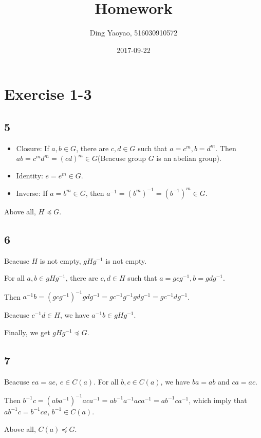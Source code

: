 \documentclass{article}
\title{Homework}
\date{2017-09-22}
\author{Ding Yaoyao, 516030910572}
\begin{document}
	\maketitle

	\section*{Exercise 1-3}
		\subsection*{5}

		\begin{itemize}
			\item Closure: If $a,b \in G$, there are $c,d \in G$ such that $a = c^m, b
				= d^m$. Then $ab=c^md^m=(cd)^m \in G$(Beacuse group $G$ is an abelian
				group).
			\item Identity: $e = e^m \in G$.
			\item Inverse: If $a = b^m \in G$, then $a^{-1} = (b^m)^{-1} = (b^{-1})^m
				\in G$.
		\end{itemize}

		Above all, $H \preccurlyeq G$.

		\subsection{6}

		Beacuse $H$ is not empty, $gHg^{-1}$ is not empty.

		For all $a, b \in gHg^{-1}$, there are $c,d \in H$ such that $a = gcg^{-1},
		b = gdg^{-1}$.

		Then $a^{-1}b = (gcg^{-1})^{-1}gdg^{-1} = gc^{-1}g^{-1}gdg^{-1} =
		gc^{-1}dg^{-1}$.

		Beacuse $c^{-1}d \in H$, we have $a^{-1}b \in gHg^{-1}$. 

		Finally, we get $gHg^{-1} \preccurlyeq G$.

		\subsection*{7}	

		Beacuse $ea = ae$, $e \in C(a)$.
		For all $b, c \in C(a)$, we have $ba = ab$ and $ca = ac$.

		Then $b^{-1}c = (aba^{-1})^{-1}aca^{-1} = ab^{-1}a^{-1}aca^{-1} =
		ab^{-1}ca^{-1}$, which imply that $ab^{-1}c=b^{-1}ca$, $b^{-1} \in C(a)$.

		Above all, $C(a) \preccurlyeq G$.
\end{document}
